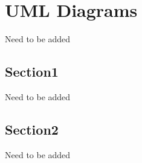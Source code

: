\chapter{UML Diagrams}
Need to be added
\section{Section1}
Need to be added
\section{Section2}
Need to be added